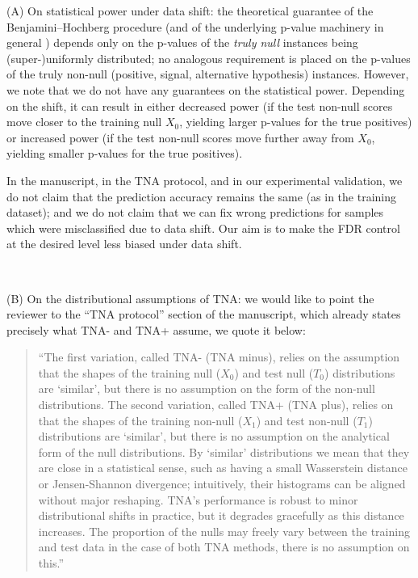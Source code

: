 \documentclass{article}
\begin{document}
{(A) On statistical power under data shift: the theoretical guarantee of the Benjamini--Hochberg procedure (and of the underlying p-value machinery in general \cite{Benjamini1995Controlling,storey2004strong}) depends only on the p-values of the {\em truly null} instances being (super-)uniformly distributed; no analogous requirement is placed on the p-values of the truly non-null (positive, signal, alternative hypothesis) instances. However, we note that we do not have any guarantees on the statistical power. Depending on the shift, it can result in either decreased power (if the test non-null scores move closer to the training null $X_0$, yielding larger p-values for the true positives) or increased power (if the test non-null scores move further away from $X_0$, yielding smaller p-values for the true positives).

In the manuscript, in the TNA protocol, and in our experimental validation, we do not claim that the prediction accuracy remains the same (as in the training dataset); and we do not claim that we can fix wrong predictions for samples which were misclassified due to data shift. Our aim is to make the FDR control at the desired level less biased under data shift.

\

(B) On the distributional assumptions of TNA: we would like to point the reviewer to the ``TNA protocol'' section of the manuscript, which already states precisely what TNA- and TNA+ assume, we quote it below:

\begin{quotation}\noindent 
``The first variation, called TNA- (TNA minus), relies on the assumption that the shapes of the training null ($X_0$) and test null ($T_0$) distributions are `similar', but there is no assumption on the form of the non-null distributions. The second variation, called TNA+ (TNA plus), relies on that the shapes of the training non-null ($X_1$) and test non-null ($T_1$) distributions are `similar', but there is no assumption on the analytical form of the null distributions. By `similar' distributions we mean that they are close in a statistical sense, such as having a small Wasserstein distance or Jensen-Shannon divergence; intuitively, their histograms can be aligned without major reshaping. TNA's performance is robust to minor distributional shifts in practice, but it degrades gracefully as this distance increases. The proportion of the nulls may freely vary between the training and test data in the case of both TNA methods, there is no assumption on this.''
\end{quotation}

}
\end{document}
